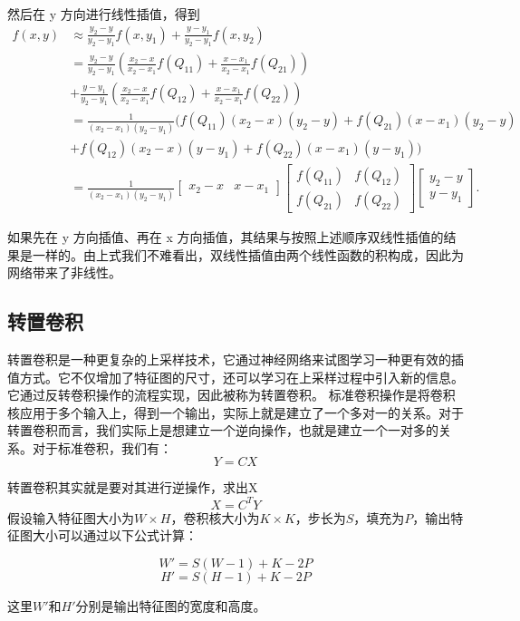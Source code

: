 然后在 y 方向进行线性插值，得到 
\begin{equation}
  \begin{aligned}
    f(x,y) &\approx \frac{y_2-y}{y_2-y_1} f(x, y_1) + \frac{y-y_1}{y_2-y_1} f(x, y_2) \\
&= \frac{y_2-y}{y_2-y_1} \left ( \frac{x_2-x}{x_2-x_1} f(Q_{11}) + \frac{x-x_1}{x_2-x_1} f(Q_{21}) \right ) \\
&+ \frac{y-y_1}{y_2-y_1} \left ( \frac{x_2-x}{x_2-x_1} f(Q_{12}) + \frac{x-x_1}{x_2-x_1} f(Q_{22}) \right ) \\
&= \frac{1}{(x_2-x_1)(y_2-y_1)} \big( f(Q_{11})(x_2-x)(y_2-y)+ f(Q_{21})(x-x_1)(y_2-y)\\
&+  f(Q_{12})(x_2-x)(y-y_1) + f(Q_{22})(x-x_1)(y-y_1) \big)\\
&=\frac{1}{(x_2-x_1)(y_2-y_1)}  \begin{bmatrix} x_2-x & x-x_1 \end{bmatrix} \begin{bmatrix} f(Q_{11}) & f(Q_{12}) \\ f(Q_{21})& f(Q_{22}) \end{bmatrix} \begin{bmatrix}
y_2-y \\ y-y_1 \end{bmatrix}.
  \end{aligned}
\end{equation}

如果先在 y 方向插值、再在 x 方向插值，其结果与按照上述顺序双线性插值的结果是一样的。由上式我们不难看出，双线性插值由两个线性函数的积构成，因此为网络带来了非线性。

\subsection{转置卷积}

转置卷积\cite{2018guideconvolutionarithmeticdeeplearning}是一种更复杂的上采样技术，它通过神经网络来试图学习一种更有效的插值方式。它不仅增加了特征图的尺寸，还可以学习在上采样过程中引入新的信息。它通过反转卷积操作的流程实现，因此被称为转置卷积。
标准卷积操作是将卷积核应用于多个输入上，得到一个输出，实际上就是建立了一个多对一的关系。对于转置卷积而言，我们实际上是想建立一个逆向操作，也就是建立一个一对多的关系。对于标准卷积，我们有：
\begin{equation}
𝑌=𝐶𝑋
\end{equation}

转置卷积其实就是要对其进行逆操作，求出X
\begin{equation}
  X=C^T Y
\end{equation}
假设输入特征图大小为\(W \times H\)，卷积核大小为\(K \times K\)，步长为\(S\)，填充为\(P\)，输出特征图大小可以通过以下公式计算：

\[ W' = S(W-1) + K - 2P \]
\[ H' = S(H-1) + K - 2P \]

这里\(W'\)和\(H'\)分别是输出特征图的宽度和高度。